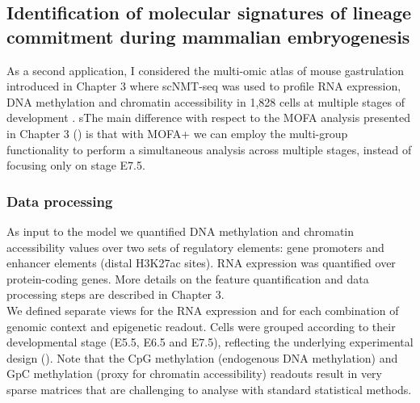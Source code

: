 
\subsection{Identification of molecular signatures of lineage commitment during mammalian embryogenesis}

As a second application, I considered the multi-omic atlas of mouse gastrulation introduced in Chapter 3 where scNMT-seq was used to profile RNA expression, DNA methylation and chromatin accessibility in 1,828 cells at multiple stages of development \cite{Argelaguet2019}. sThe main difference with respect to the MOFA analysis presented in Chapter 3 () is that with MOFA+ we can employ the multi-group functionality to perform a simultaneous analysis across multiple stages, instead of focusing only on stage E7.5.

\subsubsection{Data processing}

As input to the model we quantified DNA methylation and chromatin accessibility values over two sets of regulatory elements: gene promoters and enhancer elements (distal H3K27ac sites). RNA expression was quantified over protein-coding genes. More details on the feature quantification and data processing steps are described in Chapter 3.\\
We defined separate views for the RNA expression and for each combination of genomic context and epigenetic readout. Cells were grouped according to their developmental stage (E5.5, E6.5 and E7.5), reflecting the underlying experimental design \cite{Argelaguet2019} (). Note that the CpG methylation (endogenous DNA methylation) and GpC methylation (proxy for chromatin accessibility) readouts result in very sparse matrices that are challenging to analyse with standard statistical methods.

